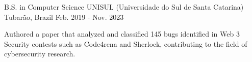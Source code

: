 
\begin{cventries}

  \cventry
    {B.S. in Computer Science} %
    {UNISUL (Universidade do Sul de Santa Catarina)} %
    {Tubarão, Brazil} %
    {Feb. 2019 - Nov. 2023} %
    {
      \begin{cvitems} %
        \item {Authored a paper that analyzed and classified 145 bugs identified in Web 3 Security contests such as Code4rena and Sherlock, contributing to the field of cybersecurity research.}
      \end{cvitems}
    }

\end{cventries}
